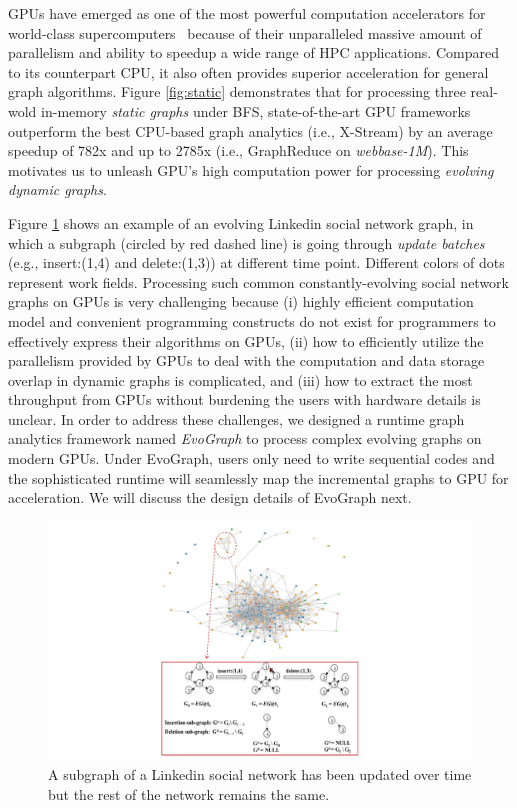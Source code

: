 GPUs have emerged as one of the most powerful computation accelerators for world-class supercomputers~\cite{titan} because of their unparalleled massive amount of parallelism and ability to speedup a wide range of HPC applications. Compared to its counterpart CPU, it also often provides superior acceleration for general graph algorithms. Figure \ref{fig:static} demonstrates that for processing three real-wold in-memory \textit{static graphs} under BFS, state-of-the-art GPU frameworks outperform the best CPU-based graph analytics (i.e., X-Stream) by an average speedup of 782x and up to 2785x (i.e., GraphReduce on \textit{webbase-1M}). This motivates us to unleash GPU's high computation power for processing \textit{evolving dynamic graphs}. 

Figure \ref{fig:link} shows an example of an evolving Linkedin social network graph, in which a subgraph (circled by red dashed line) is going through \textit{update batches} (e.g., insert:(1,4) and delete:(1,3)) at different time point. Different colors of dots represent work fields. Processing such common constantly-evolving social network graphs on GPUs is very challenging because (i) highly efficient computation model and convenient programming constructs do not exist for programmers to effectively express their algorithms on GPUs, (ii) how to efficiently utilize the parallelism provided by GPUs to deal with the computation and data storage overlap in dynamic graphs is complicated, and (iii) how to extract the most throughput from GPUs without burdening the users with hardware details is unclear. In order to address these challenges, we designed a runtime graph analytics framework named \textit{EvoGraph} to process complex evolving graphs on modern GPUs. Under EvoGraph, users only need to write sequential codes and the sophisticated runtime will seamlessly map the incremental graphs to GPU for acceleration. We will discuss the design details of EvoGraph next. 



\begin{figure}[!t]
\centering
\includegraphics [width=1\columnwidth]{figures/link.pdf}
\caption{A subgraph of a Linkedin social network has been updated over time but the rest of the network remains the same. }
\label{fig:link}
\end{figure}



